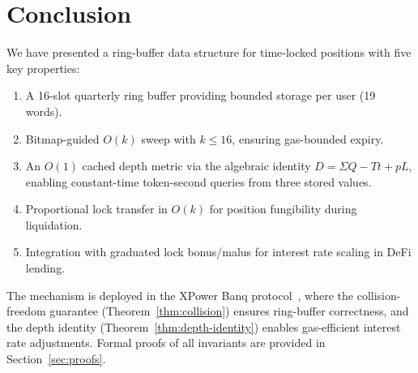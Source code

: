 \documentclass[10pt,a4paper,twocolumn]{article}
\theoremstyle{definition}
\theoremstyle{plain}
\theoremstyle{remark}
\begin{document}
\section{Conclusion}
\label{sec:conclusion}

We have presented a ring-buffer data structure for time-locked positions with five key properties:

\begin{enumerate}[leftmargin=*, nosep]
\item A 16-slot quarterly ring buffer providing bounded storage per user (19 words).
\item Bitmap-guided $O(k)$ sweep with $k \leq 16$, ensuring gas-bounded expiry.
\item An $O(1)$ cached depth metric via the algebraic identity $D = \Sigma Q - Tt + pL$, enabling constant-time token-second queries from three stored values.
\item Proportional lock transfer in $O(k)$ for position fungibility during liquidation.
\item Integration with graduated lock bonus/malus for interest rate scaling in DeFi lending.
\end{enumerate}

The mechanism is deployed in the XPower Banq protocol~\cite{wp}, where the collision-freedom guarantee (Theorem~\ref{thm:collision}) ensures ring-buffer correctness, and the depth identity (Theorem~\ref{thm:depth-identity}) enables gas-efficient interest rate adjustments. Formal proofs of all invariants are provided in Section~\ref{sec:proofs}.
\end{document}
